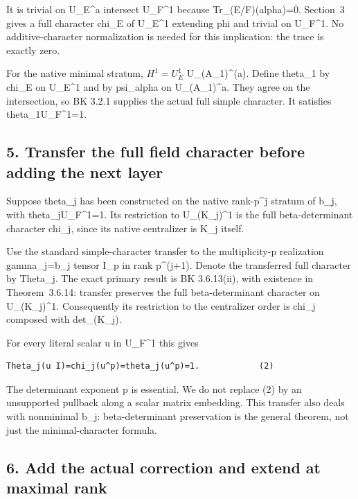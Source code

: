 It is trivial on U\_E\^{}a intersect U\_F\^{}1 because
Tr\_(E/F)(alpha)=0. Section~3 gives a full character chi\_E of U\_E\^{}1
extending phi and trivial on U\_F\^{}1. No additive-character
normalization is needed for this implication: the trace is exactly zero.

For the native minimal stratum, \(H^1=U_E^1\)
U\_(A\_1)\^{}(a). Define theta\_1 by chi\_E on U\_E\^{}1 and by
psi\_alpha on U\_(A\_1)\^{}a. They agree on the intersection, so BK 3.2.1
supplies the actual full simple character. It satisfies
theta\_1\textbar U\_F\^{}1=1.

\hypertarget{odd_character-transfer-the-full-field-character-before-adding-the-next-layer}{%
\subsection{5. Transfer the full field character before adding the next
layer}\label{odd_character-transfer-the-full-field-character-before-adding-the-next-layer}}

Suppose theta\_j has been constructed on the native rank-p\^{}j stratum
of b\_j, with theta\_j\textbar U\_F\^{}1=1. Its restriction to
U\_(K\_j)\^{}1 is the full beta-determinant character chi\_j, since its
native centralizer is K\_j itself.

Use the standard simple-character transfer to the multiplicity-p
realization gamma\_j=b\_j tensor I\_p in rank p\^{}(j+1). Denote the
transferred full character by Theta\_j. The exact primary result is
BK 3.6.13(ii), with existence in Theorem~3.6.14: transfer preserves the
full beta-determinant character on U\_(K\_j)\^{}1. Consequently its
restriction to the centralizer order is chi\_j composed with
det\_(K\_j).

For every literal scalar u in U\_F\^{}1 this gives

\begin{Verbatim}[fontsize=\small,breaklines=true,breakanywhere=true]
Theta_j(u I)=chi_j(u^p)=theta_j(u^p)=1.            (2)
\end{Verbatim}

The determinant exponent p is essential. We do not replace (2) by an
unsupported pullback along a scalar matrix embedding. This transfer also
deals with nonminimal b\_j: beta-determinant preservation is the general
theorem, not just the minimal-character formula.

\hypertarget{odd_character-add-the-actual-correction-and-extend-at-maximal-rank}{%
\subsection{6. Add the actual correction and extend at maximal
rank}\label{odd_character-add-the-actual-correction-and-extend-at-maximal-rank}}


